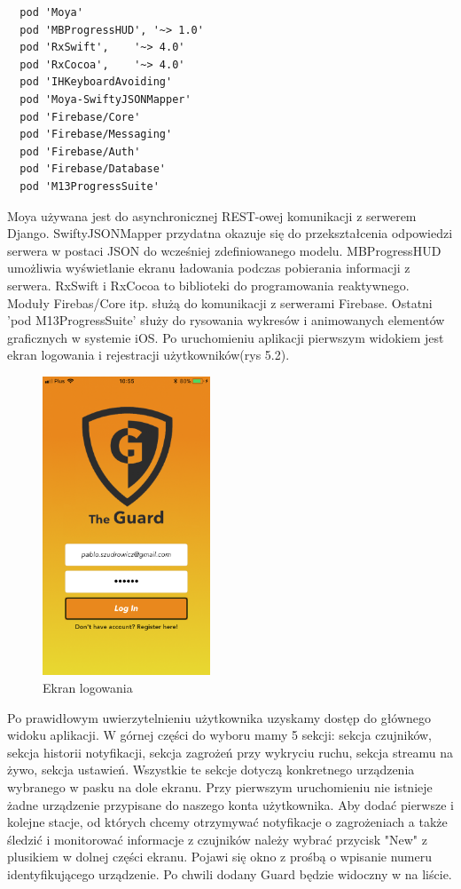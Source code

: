 \begin{verbatim}
  pod 'Moya'
  pod 'MBProgressHUD', '~> 1.0'
  pod 'RxSwift',    '~> 4.0'
  pod 'RxCocoa',    '~> 4.0'
  pod 'IHKeyboardAvoiding'
  pod 'Moya-SwiftyJSONMapper'
  pod 'Firebase/Core'
  pod 'Firebase/Messaging'
  pod 'Firebase/Auth'
  pod 'Firebase/Database'
  pod 'M13ProgressSuite'
\end{verbatim}
Moya używana jest do asynchronicznej REST-owej komunikacji z serwerem Django. SwiftyJSONMapper przydatna okazuje się do przekształcenia odpowiedzi serwera w postaci JSON do wcześniej zdefiniowanego modelu. MBProgressHUD umożliwia wyświetlanie ekranu ładowania podczas pobierania informacji z serwera. RxSwift i RxCocoa to biblioteki do programowania reaktywnego. Moduły Firebas/Core itp. służą do komunikacji z serwerami Firebase. Ostatni 'pod M13ProgressSuite' służy do rysowania wykresów i animowanych elementów graficznych w systemie iOS.
Po uruchomieniu aplikacji pierwszym widokiem jest ekran logowania i rejestracji użytkowników(rys 5.2). 
\begin{figure}[h]
	\centering
	\includegraphics[width=5cm]{login.png}
	\caption{Ekran logowania}
\end{figure}
Po prawidłowym uwierzytelnieniu użytkownika uzyskamy dostęp do głównego widoku aplikacji. W górnej części do wyboru mamy 5 sekcji:
sekcja czujników, sekcja historii notyfikacji, sekcja zagrożeń przy wykryciu ruchu, sekcja streamu na żywo, sekcja ustawień. Wszystkie te sekcje dotyczą konkretnego urządzenia wybranego w pasku na dole ekranu. Przy pierwszym uruchomieniu nie istnieje żadne urządzenie przypisane do naszego konta użytkownika. Aby dodać pierwsze i kolejne stacje, od których chcemy otrzymywać notyfikacje o zagrożeniach a także śledzić i monitorować informacje z czujników należy wybrać przycisk "New" z plusikiem w dolnej części ekranu. Pojawi się okno z prośbą o wpisanie numeru identyfikującego urządzenie. Po chwili dodany Guard będzie widoczny w na liście.
